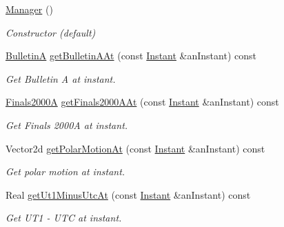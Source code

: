 \begin{DoxyCompactItemize}
\item 
\hyperlink{classlibrary_1_1physics_1_1coord_1_1frame_1_1provider_1_1iers_1_1_manager_a8be831f65e5851152337a19de02cf23d}{Manager} ()
\begin{DoxyCompactList}\small\item\em Constructor (default) \end{DoxyCompactList}\item 
\hyperlink{classlibrary_1_1physics_1_1coord_1_1frame_1_1provider_1_1iers_1_1_bulletin_a}{BulletinA} \hyperlink{classlibrary_1_1physics_1_1coord_1_1frame_1_1provider_1_1iers_1_1_manager_ab6d7d7f3bdbf9d982a8507aa2455d6ca}{get\+Bulletin\+A\+At} (const \hyperlink{classlibrary_1_1physics_1_1time_1_1_instant}{Instant} \&an\+Instant) const
\begin{DoxyCompactList}\small\item\em Get Bulletin A at instant. \end{DoxyCompactList}\item 
\hyperlink{classlibrary_1_1physics_1_1coord_1_1frame_1_1provider_1_1iers_1_1_finals2000_a}{Finals2000A} \hyperlink{classlibrary_1_1physics_1_1coord_1_1frame_1_1provider_1_1iers_1_1_manager_a7e419906c184e80e78b1538c929b9fc1}{get\+Finals2000\+A\+At} (const \hyperlink{classlibrary_1_1physics_1_1time_1_1_instant}{Instant} \&an\+Instant) const
\begin{DoxyCompactList}\small\item\em Get Finals 2000A at instant. \end{DoxyCompactList}\item 
Vector2d \hyperlink{classlibrary_1_1physics_1_1coord_1_1frame_1_1provider_1_1iers_1_1_manager_a3023a701ae8b2abf5a93e9c0c46db37a}{get\+Polar\+Motion\+At} (const \hyperlink{classlibrary_1_1physics_1_1time_1_1_instant}{Instant} \&an\+Instant) const
\begin{DoxyCompactList}\small\item\em Get polar motion at instant. \end{DoxyCompactList}\item 
Real \hyperlink{classlibrary_1_1physics_1_1coord_1_1frame_1_1provider_1_1iers_1_1_manager_a67749dc760378bc56c82cc752833e4d9}{get\+Ut1\+Minus\+Utc\+At} (const \hyperlink{classlibrary_1_1physics_1_1time_1_1_instant}{Instant} \&an\+Instant) const
\begin{DoxyCompactList}\small\item\em Get U\+T1 -\/ U\+TC at instant. \end{DoxyCompactList}\item 

\end{DoxyCompactItemize}
